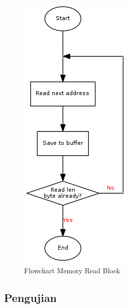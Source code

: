 \begin{figure}[!h]
\centering
\includegraphics[height=0.5\textheight]{image/memory/flow_readblock.png}
\caption{Flowchart Memory Read Block}
\label{fig-flow-readblock}
\end{figure}

\subsection {Pengujian}

